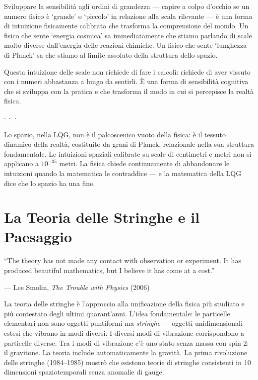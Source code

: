 \documentclass[12pt,a4paper,openany]{book}
\newcommand{\sezione}[1]{\vspace{1.2em}{\large\bfseries #1}\vspace{0.5em}\par}
\newcommand{\puntini}{\begin{center}$\cdot\ \cdot\ \cdot$\end{center}\vspace{0.3em}}
\begin{document}
Sviluppare la sensibilità agli ordini di grandezza --- capire a colpo d'occhio se un numero fisico è `grande' o `piccolo' in relazione alla scala rilevante --- è una forma di intuizione fisicamente calibrata che trasforma la comprensione del mondo. Un fisico che sente `energia cosmica' sa immediatamente che stiamo parlando di scale molto diverse dall'energia delle reazioni chimiche. Un fisico che sente `lunghezza di Planck' sa che stiamo al limite assoluto della struttura dello spazio.

Questa intuizione delle scale non richiede di fare i calcoli: richiede di aver vissuto con i numeri abbastanza a lungo da sentirli. È una forma di sensibilità cognitiva che si sviluppa con la pratica e che trasforma il modo in cui si percepisce la realtà fisica.

\puntini

Lo spazio, nella LQG, non è il palcoscenico vuoto della fisica: è il tessuto dinamico della realtà, costituito da grani di Planck, relazionale nella sua struttura fondamentale. Le intuizioni spaziali calibrate su scale di centimetri e metri non si applicano a $10^{-35}$ metri. La fisica chiede continuamente di abbandonare le intuizioni quando la matematica le contraddice --- e la matematica della LQG dice che lo spazio ha una fine.

\chapter{La Teoria delle Stringhe e il Paesaggio}

\epigraph{``The theory has not made any contact with observation or experiment. It has produced beautiful mathematics, but I believe it has come at a cost.''}{--- Lee Smolin, \textit{The Trouble with Physics} (2006)}

\sezione{L'idea}

La teoria delle stringhe è l'approccio alla unificazione della fisica più studiato e più contestato degli ultimi quarant'anni. L'idea fondamentale: le particelle elementari non sono oggetti puntiformi ma \textit{stringhe} — oggetti unidimensionali estesi che vibrano in modi diversi. I diversi modi di vibrazione corrispondono a particelle diverse. Tra i modi di vibrazione c'è uno stato senza massa con spin 2: il gravitone. La teoria include automaticamente la gravità. La prima rivoluzione delle stringhe (1984--1985) mostrò che esistono teorie di stringhe consistenti in 10 dimensioni spaziotemporali senza anomalie di gauge.
\end{document}
